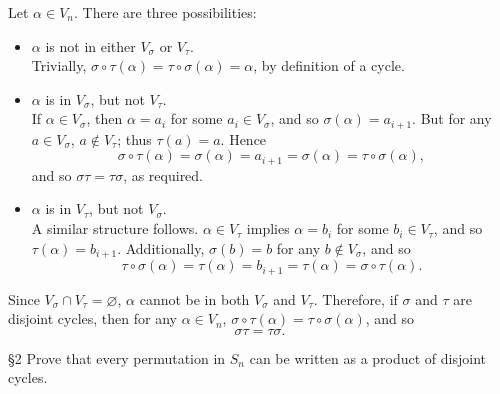 \documentclass{homework}
\begin{document}
\begin{solution}
\begin{enumerate}[label=(\alph*)]
      Let $ \alpha\in V_n$. There are three possibilities:
      \begin{itemize}
        \item $\alpha$ is not in either $V_\sigma$ or $V_\tau$.\\
          Trivially, $\sigma\circ \tau(\alpha)=\tau\circ \sigma(\alpha)=\alpha$, by definition of a cycle.
        \item $\alpha$ is in $V_\sigma$, but not $V_\tau$.\\
          If $\alpha\in V_\sigma$, then $\alpha=a_i$ for some $a_i\in V_\sigma$, and so
          $\sigma(\alpha)=a_{i+1}$. But for any $a\in V_\sigma$, $a\not\in V_\tau$; thus
          $\tau(a)=a$. Hence \[
            \sigma\circ \tau(\alpha)=\sigma(\alpha)=a_{i+1}=\sigma(\alpha)=\tau\circ \sigma(\alpha)
          ,\]  and so $\sigma\tau=\tau\sigma$, as required.
        \item $\alpha$ is in $V_\tau$, but not $V_\sigma$.\\
          A similar structure follows. $\alpha\in V_\tau$ implies $\alpha=b_i$ for some $b_i\in
          V_\tau$, and so $\tau(\alpha)=b_{i+1}$. Additionally, $\sigma(b)=b$ for any $b\not\in
          V_\sigma$, and so \[
            \tau\circ \sigma(\alpha)=\tau(\alpha)=b_{i+1}=\tau(\alpha)=\sigma\circ \tau(\alpha)
          .\] 
      \end{itemize}
      Since $V_\sigma\cap V_\tau=\varnothing$, $\alpha$ cannot be in both $V_\sigma$ and $V_\tau$.
      Therefore, if $ \sigma$ and $\tau$ are disjoint cycles, then for any $ \alpha\in V_n$,
      $\sigma\circ \tau(\alpha)=\tau\circ \sigma(\alpha)$, and so \[
        \sigma\tau=\tau\sigma
      .\] 
  \end{enumerate}
\end{solution}


\begin{problem}{\S 2}
  Prove that every permutation in $S_n$ can be written as a product of disjoint cycles.
\end{problem}
\end{document}
